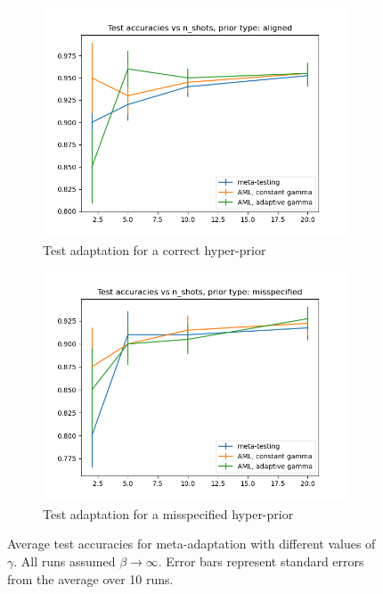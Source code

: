 \documentclass{article}
\theoremstyle{definition}
\begin{document}
\begin{figure}[h!]
	\centering
	\begin{subfigure}[b]{0.49\textwidth}
		\centering
		\includegraphics[width=\textwidth]{test_accuracies_model_aligned}
		\caption{Test adaptation for a correct hyper-prior}
	\end{subfigure}
	\hfill
	\begin{subfigure}[b]{0.49\textwidth}
		\centering
		\includegraphics[width=\textwidth]{test_accuracies_model_misspecified}
		\caption{Test adaptation for a misspecified hyper-prior}	 	
	\end{subfigure}
	\hfill
	\caption{Average test accuracies for meta-adaptation with different values of $\gamma$. All runs assumed $\beta\rightarrow\infty$. Error bars represent standard errors from the average over 10 runs.}	 
	\label{fig:results-gamma}
\end{figure}
\end{document}
